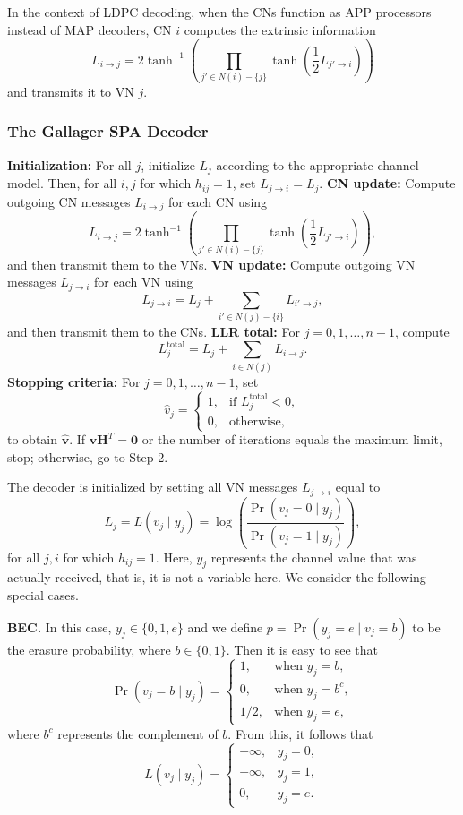 \documentclass[11pt]{article}
\begin{document}
In the context of LDPC decoding, when the CNs function as APP processors instead of MAP decoders, CN $i$ computes the extrinsic information
\[
\boxed{
L_{i \to j} = 2\tanh^{-1}\left(\prod_{j' \in N(i)-\{j\}} \tanh\left(\frac{1}{2}L_{j' \to i}\right)\right)
}
\]
and transmits it to VN $j$. 

\subsubsection{The Gallager SPA Decoder}

\begin{algorithm}[H]
\caption{The Gallager Sum-Product Algorithm}
\begin{algorithmic}[1]
\State \textbf{Initialization:} For all $j$, initialize $L_j$ according to the appropriate channel model. Then, for all $i,j$ for which $h_{ij} = 1$, set $L_{j \to i} = L_j$.
\State \textbf{CN update:} Compute outgoing CN messages $L_{i \to j}$ for each CN using
  \[
  L_{i \to j} = 2\tanh^{-1}\left(\prod_{j' \in N(i)-\{j\}} \tanh\left(\frac{1}{2}L_{j' \to i}\right)\right),
  \]
  and then transmit them to the VNs.
\State \textbf{VN update:} Compute outgoing VN messages $L_{j \to i}$ for each VN using
  \[
  L_{j \to i} = L_j + \sum_{i' \in N(j)-\{i\}} L_{i' \to j},
  \]
  and then transmit them to the CNs.
\State \textbf{LLR total:} For $j = 0,1,\ldots,n-1$, compute
  \[
  L_j^{\text{total}} = L_j + \sum_{i \in N(j)} L_{i \to j}.
  \]
\State \textbf{Stopping criteria:} For $j = 0,1,\ldots,n-1$, set
  \[
  \hat{v}_j =
  \begin{cases}
  1, & \text{if } L_j^{\text{total}} < 0, \\
  0, & \text{otherwise,}
  \end{cases}
  \]
  to obtain $\hat{\mathbf{v}}$. If $\hat{\mathbf{v}}\mathbf{H}^{T} = \mathbf{0}$ or the number of iterations equals the maximum limit, stop; otherwise, go to Step 2.
\end{algorithmic}
\end{algorithm}

The decoder is initialized by setting all VN messages $L_{j \to i}$ equal to
\[
L_j = L(v_j \mid y_j) = \log\left(\frac{\Pr(v_j = 0 \mid y_j)}{\Pr(v_j = 1 \mid y_j)}\right),
\]
for all $j,i$ for which $h_{ij} = 1$. Here, $y_j$ represents the channel value that was actually received, that is, it is not a variable here. We consider the following special cases.

\textbf{BEC.} In this case, $y_j \in \{0,1,e\}$ and we define $p = \Pr(y_j = e \mid v_j = b)$ to be the erasure probability, where $b \in \{0,1\}$. Then it is easy to see that
\[
\Pr(v_j = b \mid y_j) =
\begin{cases}
1, & \text{when } y_j = b, \\
0, & \text{when } y_j = b^c, \\
1/2, & \text{when } y_j = e,
\end{cases}
\]
where $b^c$ represents the complement of $b$. From this, it follows that
\[
L(v_j \mid y_j) =
\begin{cases}
+\infty, & y_j = 0, \\
-\infty, & y_j = 1, \\
0, & y_j = e.
\end{cases}
\]
\end{document}
